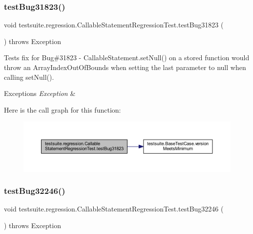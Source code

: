 \subsubsection{\texorpdfstring{test\+Bug31823()}{testBug31823()}}
{\footnotesize\ttfamily void testsuite.\+regression.\+Callable\+Statement\+Regression\+Test.\+test\+Bug31823 (\begin{DoxyParamCaption}{ }\end{DoxyParamCaption}) throws Exception}

Tests fix for Bug\#31823 -\/ Callable\+Statement.\+set\+Null() on a stored function would throw an Array\+Index\+Out\+Of\+Bounds when setting the last parameter to null when calling set\+Null().


\begin{DoxyExceptions}{Exceptions}
{\em Exception} & \\
\hline
\end{DoxyExceptions}
Here is the call graph for this function\+:
\nopagebreak
\begin{figure}[H]
\begin{center}
\leavevmode
\includegraphics[width=350pt]{classtestsuite_1_1regression_1_1_callable_statement_regression_test_a28a91e6259cced18e90ef08947170c38_cgraph}
\end{center}
\end{figure}
\mbox{\label{classtestsuite_1_1regression_1_1_callable_statement_regression_test_ae409019fbd71b0dbfac43b3a30ed326e}} 
\subsubsection{\texorpdfstring{test\+Bug32246()}{testBug32246()}}
{\footnotesize\ttfamily void testsuite.\+regression.\+Callable\+Statement\+Regression\+Test.\+test\+Bug32246 (\begin{DoxyParamCaption}{ }\end{DoxyParamCaption}) throws Exception}

